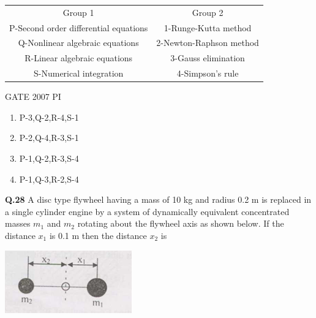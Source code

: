 \documentclass[journal,12pt,onecolumn]{exam}
\theoremstyle{remark}
\begin{document}
        \begin{tabular}{c|c}
        Group 1     &  Group 2\\
      P-Second order differential equations       & 1-Runge-Kutta method\\
      Q-Nonlinear algebraic equations & 2-Newton-Raphson method\\
      R-Linear algebraic equations & 3-Gauss elimination\\
      S-Numerical integration & 4-Simpson's rule
      
        \end{tabular}
        \hfill{GATE 2007 PI}
        \begin{enumerate}
            \item P-3,Q-2,R-4,S-1
            \item P-2,Q-4,R-3,S-1
            \item P-1,Q-2,R-3,S-4
            \item P-1,Q-3,R-2,S-4
        \end{enumerate}
        \noindent
        \textbf{Q.28}
        	A disc type flywheel having a mass of 10 kg and radius 0.2 m is replaced in a single cylinder engine by a system of dynamically equivalent concentrated masses $m_{1}$ and $m_{2}$ rotating about the flywheel axis as shown below. If the distance $x_{1}$ is 0.1 m then the distance $x_{2}$ is
            
             
                  \includegraphics[width=0.2\linewidth]{figs/Q.28.png}
                  
\end{document}

